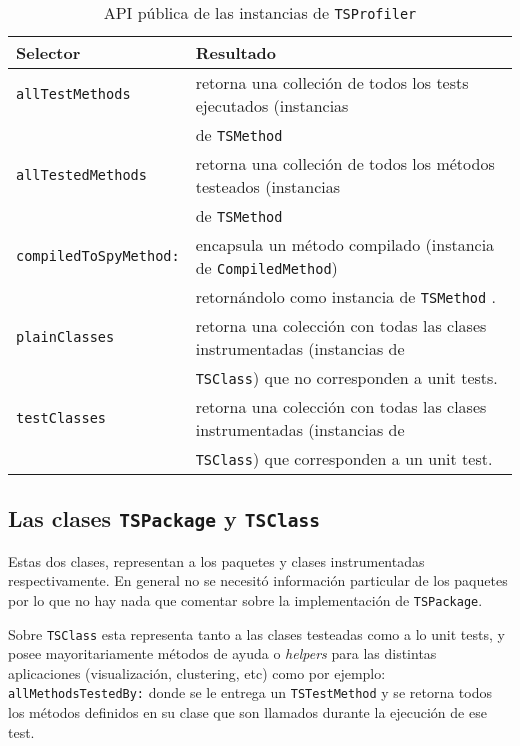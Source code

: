 \begin{table}[h] 
    \centering 
    \begin{tabular}{|l|l|}
    	\hline
\textbf{Selector} & \textbf{Resultado} \\ \hline \hline
{\tt allTestMethods}	& retorna una colleción de todos los tests ejecutados (instancias\\
						&  de {\tt TSMethod}  \\ \hline
{\tt allTestedMethods} & retorna una colleción de todos los métodos testeados (instancias  \\
						& de {\tt TSMethod} \\ \hline
{\tt compiledToSpyMethod:} & encapsula un método compilado (instancia de {\tt CompiledMethod}) \\
						& retornándolo como instancia de {\tt TSMethod} . \\ \hline
{\tt plainClasses} & retorna una colección con todas las clases instrumentadas (instancias de  \\ 
						&{\tt TSClass}) que no corresponden a unit tests. \\ \hline
{\tt testClasses} & retorna una colección con todas las clases instrumentadas (instancias de \\ 
						&{\tt TSClass}) que corresponden a un unit test. \\ \hline
    \end{tabular}
    \caption{API pública de las instancias de {\tt TSProfiler}}
\end{table} 


\subsection{Las clases {\tt TSPackage} y {\tt TSClass}}

\par Estas dos clases, representan a los paquetes y clases instrumentadas respectivamente. En general no se necesitó información particular de los paquetes por lo que no hay nada que comentar sobre la implementación de {\tt TSPackage}.

\par Sobre {\tt TSClass} esta representa tanto a las clases testeadas como a lo unit tests, y posee mayoritariamente métodos de ayuda o \emph{helpers} para las distintas aplicaciones (visualización, clustering, etc) como por ejemplo: {\tt allMethodsTestedBy:} donde se le entrega un {\tt TSTestMethod} y se retorna todos los métodos definidos en su clase que son llamados durante la ejecución de ese test.  


